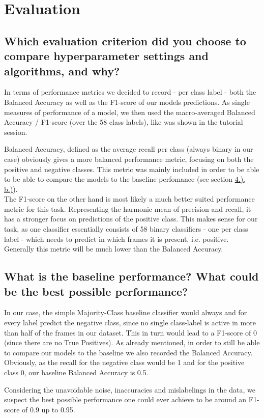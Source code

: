 
\section{Evaluation}
\label{sec:Evaluation}






\subsection{Which evaluation criterion did you choose to compare hyperparameter settings and algorithms, and why? }
\label{sec:Evaluation:a}

In terms of performance metrics we decided to record - per class label - both the Balanced Accuracy as well as the F1-score of our models predictions. As single measures of performance of a model, we then used the macro-averaged Balanced Accuracy / F1-score (over the 58 class labels), like was shown in the tutorial session. 

Balanced Accuracy, defined as the average recall per class (always binary in our case) obviously gives a more balanced performance metric, focusing on both the positive and negative classes. This metric was mainly included in order to be able to be able to compare the models to the baseline perfomance (see section \hyperref[sec:Evaluation:b]{4.), b.)}).\\
The F1-score on the other hand is most likely a much better suited performance metric for this task. Representing the harmonic mean of precision and recall, it has a stronger focus on predictions of the positive class. This makes sense for our task, as one classifier essentially consists of 58 binary classifiers - one per class label - which needs to predict in which frames it is present, i.e. positive. Generally this metric will be much lower than the Balanced Accuracy.


\subsection{What is the baseline performance? What could be the best possible performance? }
\label{sec:Evaluation:b}

In our case, the simple Majority-Class baseline classifier would always and for every label predict the negative class, since no single class-label is active in more than half of the frames in our dataset. This in turn would lead to a F1-score of 0 (since there are no True Positives). As already mentioned, in order to still be able to compare our models to the baseline we also recorded the Balanced Accuracy. Obviously, as the recall for the negative class would be 1 and for the positive class 0, our baseline Balanced Accuracy is 0.5.

Considering the unavoidable noise, inaccuracies and mislabelings in the data, we suspect the best possible performance one could ever achieve to be around an F1-score of 0.9 up to 0.95.



